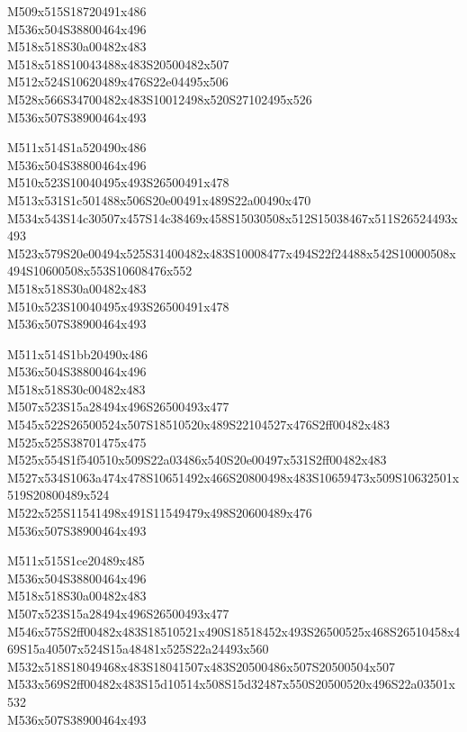 \documentclass{article}
\begin{document}
\begin{multicols}{5}
\begin{center}
M509x515S18720491x486 %
\\M536x504S38800464x496 %
\\M518x518S30a00482x483 %
\\M518x518S10043488x483S20500482x507 %
\\M512x524S10620489x476S22e04495x506 %
\\M528x566S34700482x483S10012498x520S27102495x526 %
\\M536x507S38900464x493 %
\vfil
\columnbreak

M511x514S1a520490x486 %
\\M536x504S38800464x496 %
\\M510x523S10040495x493S26500491x478 %
\\M513x531S1c501488x506S20e00491x489S22a00490x470 %
\\M534x543S14c30507x457S14c38469x458S15030508x512S15038467x511S26524493x493 %
\\M523x579S20e00494x525S31400482x483S10008477x494S22f24488x542S10000508x494S10600508x553S10608476x552 %
\\M518x518S30a00482x483 %
\\M510x523S10040495x493S26500491x478 %
\\M536x507S38900464x493 %
\vfil
\columnbreak

M511x514S1bb20490x486 %
\\M536x504S38800464x496 %
\\M518x518S30c00482x483 %
\\M507x523S15a28494x496S26500493x477 %
\\M545x522S26500524x507S18510520x489S22104527x476S2ff00482x483 %
\\M525x525S38701475x475 %
\\M525x554S1f540510x509S22a03486x540S20e00497x531S2ff00482x483 %
\\M527x534S1063a474x478S10651492x466S20800498x483S10659473x509S10632501x519S20800489x524 %
\\M522x525S11541498x491S11549479x498S20600489x476 %
\\M536x507S38900464x493 %
\vfil
\columnbreak

M511x515S1ce20489x485 %
\\M536x504S38800464x496 %
\\M518x518S30a00482x483 %
\\M507x523S15a28494x496S26500493x477 %
\\M546x575S2ff00482x483S18510521x490S18518452x493S26500525x468S26510458x469S15a40507x524S15a48481x525S22a24493x560 %
\\M532x518S18049468x483S18041507x483S20500486x507S20500504x507 %
\\M533x569S2ff00482x483S15d10514x508S15d32487x550S20500520x496S22a03501x532 %
\\M536x507S38900464x493 %
\vfil
\columnbreak


\end{center}
\end{multicols}
\end{document}
